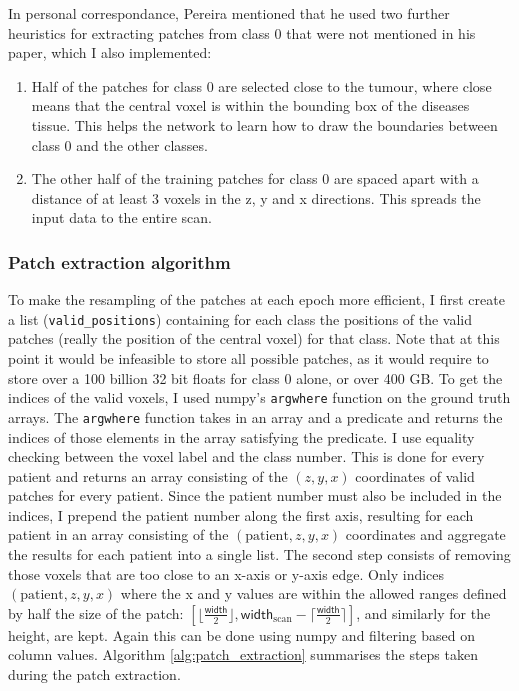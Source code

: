 \documentclass[12pt,a4paper,twoside,openright]{report}
\begin{document}
In personal correspondance, Pereira mentioned that he used two further heuristics for extracting patches from class 0 that were not mentioned in his paper, which I also implemented:
\begin{enumerate}
	\item Half of the patches for class 0 are selected close to the tumour, where close means that the central voxel is within the bounding box of the diseases tissue. This helps the network to learn how to draw the boundaries between class 0 and the other classes.
	\item The other half of the training patches for class 0 are spaced apart with a distance of at least 3 voxels in the z, y and x directions. This spreads the input data to the entire scan.
\end{enumerate}


\subsubsection{Patch extraction algorithm}
To make the resampling of the patches at each epoch more efficient, I first create a list (\texttt{valid\_positions}) containing for each class the positions of the valid patches (really the position of the central voxel) for that class. Note that at this point it would be infeasible to store all possible patches, as it would require to store over a 100 billion 32 bit floats for class 0 alone, or over 400 GB. To get the indices of the valid voxels, I used numpy's \texttt{argwhere} function on the ground truth arrays. The \texttt{argwhere} function takes in an array and a predicate and returns the indices of those elements in the array satisfying the predicate. I use equality checking between the voxel label and the class number. This is done for every patient and returns an array consisting of the $(z, y, x)$ coordinates of valid patches for every patient. Since the patient number must also be included in the indices, I prepend the patient number along the first axis, resulting for each patient in an array consisting of the $(\text{patient}, z, y, x)$ coordinates and aggregate the results for each patient into a single list. The second step consists of removing those voxels that are too close to an x-axis or y-axis edge. Only indices $(\text{patient}, z, y, x)$ where the x and y values are  within the allowed ranges defined by half the size of the patch: $[\lfloor \frac{\textsf{width}}{2} \rfloor, \textsf{width}_{\text{scan}} - \lceil \frac{\textsf{width}}{2} \rceil]$, and similarly for the height, are kept. Again this can be done using numpy and filtering based on column values. Algorithm \ref{alg:patch_extraction} summarises the steps taken during the patch extraction. 
\end{document}
